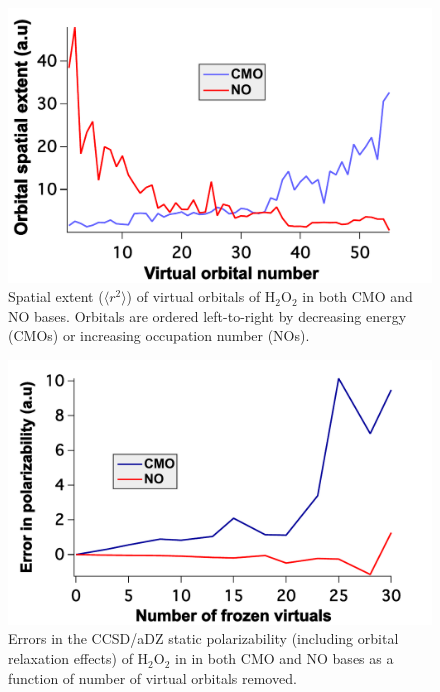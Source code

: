 \begin{figure}
  \centering
  \includegraphics[width=0.6\linewidth]{figures/spatial.pdf}
  \caption{Spatial extent ($\langle r^2\rangle$) of virtual
orbitals of H$_2$O$_2$ in both CMO and NO bases.  Orbitals are ordered
left-to-right by
decreasing energy (CMOs) or increasing occupation number (NOs).}
   \label{fig:spatial}
\end{figure}

\begin{figure}
  \centering
  \includegraphics[width=0.6\linewidth]{figures/polar_static.pdf}
  \caption{Errors in the CCSD/aDZ static polarizability 
(including orbital relaxation effects) of H$_2$O$_2$ in
       in both CMO and NO bases as a function of number of virtual orbitals
removed.}
   \label{fig:static}
\end{figure}

